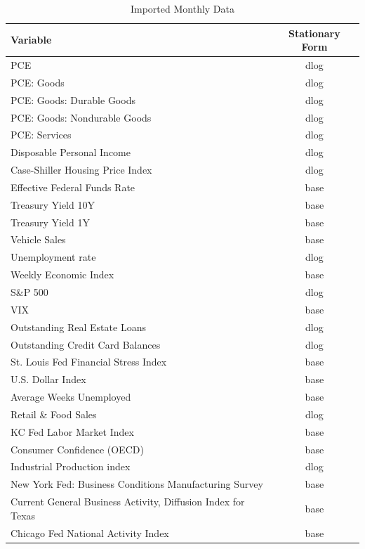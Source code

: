\documentclass[11pt, letterpaper]{article}\usepackage[]{graphicx}\usepackage[]{color}
\begin{document}
\begin{table}[H]
\centering
\begingroup\scriptsize
\begin{tabular}{lc}
  \hline
Variable & Stationary Form \\ 
  \hline
PCE & dlog \\ 
  PCE: Goods & dlog \\ 
  PCE: Goods: Durable Goods & dlog \\ 
  PCE: Goods: Nondurable Goods & dlog \\ 
  PCE: Services & dlog \\ 
  Disposable Personal Income & dlog \\ 
  Case-Shiller Housing Price Index & dlog \\ 
  Effective Federal Funds Rate & base \\ 
  Treasury Yield 10Y & base \\ 
  Treasury Yield 1Y & base \\ 
  Vehicle Sales & base \\ 
  Unemployment rate & dlog \\ 
  Weekly Economic Index & base \\ 
  S\&P 500 & dlog \\ 
  VIX & base \\ 
  Outstanding Real Estate Loans & dlog \\ 
  Outstanding Credit Card Balances & dlog \\ 
  St. Louis Fed Financial Stress Index & base \\ 
  U.S. Dollar Index & base \\ 
  Average Weeks Unemployed & base \\ 
  Retail \& Food Sales & dlog \\ 
  KC Fed Labor Market Index & base \\ 
  Consumer Confidence (OECD) & base \\ 
  Industrial Production index & dlog \\ 
  New York Fed: Business Conditions Manufacturing Survey & base \\ 
  Current General Business Activity, Diffusion Index for Texas & base \\ 
  Chicago Fed National Activity Index & base \\ 
   \hline
\end{tabular}
\endgroup
\caption{Imported Monthly Data} 
\end{table}
\end{document}
